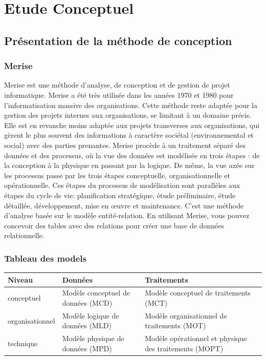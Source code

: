 \chapter{Etude Conceptuel}
\section{Présentation de la méthode de conception}
\subsection{Merise}
Merise est une méthode d'analyse, de conception et de gestion de projet
informatique.
Merise a été très utilisée dans les années 1970 et 1980 pour l'informatisation
massive des organisations. Cette méthode reste adaptée pour la gestion des
projets internes aux organisations, se limitant à un domaine précis. Elle est en
revanche moins adaptée aux projets transverses aux organisations, qui gèrent le
plus souvent des informations à caractère sociétal (environnemental et social)
avec des parties prenantes.
Merise procède à un traitement séparé des données et des processus, où la vue
des données est modélisée en trois étapes : de la conception à la physique en
passant par la logique. De même, la vue axée sur les processus passe par les
trois étapes conceptuelle, organisationnelle et opérationnelle. Ces étapes du
processus de modélisation sont parallèles aux étapes du cycle de
vie: planification stratégique, étude préliminaire, étude détaillée,
développement, mise en œuvre et maintenance. C'est une méthode d'analyse
basée sur le modèle entité-relation.
En utilisant Merise, vous pouvez concevoir des tables avec des relations pour
créer une base de données relationnelle.
\subsection{Tableau des models}
\begin{table}[ht]
    \begin{tabularx}{\textwidth}{|X|X|X|}
    
        \hline
        \textbf{Niveau}    & \textbf{Données} & \textbf{Traitements}  \\
        \hline
        conceptuel & Modèle conceptuel de données (MCD) & Modèle conceptuel de traitements (MCT) \\
        \hline
        organisationnel & Modèle logique de données (MLD) & Modèle organisationnel de traitements (MOT)  \\
        \hline
        technique & Modèle physique de données (MPD) & Modèle opérationnel et physique des traitements (MOPT) \\
        \hline
    \end{tabularx}
\end{table}
